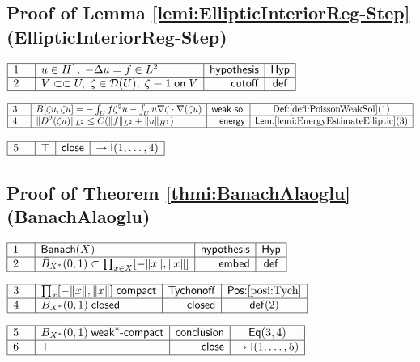 \documentclass[11pt,reqno]{amsart}
\begin{document}
	\subsection*{Proof of Lemma \protect\ref{lemi:EllipticInteriorReg-Step} (\textsf{EllipticInteriorReg-Step})}
	\noindent$\begin{array}{|m{0.5cm}|l|r|c|}
	\hline
	1 & u\in H^{1},\;-\Delta u=f\in L^{2} & \mathsf{hypothesis} & \mathsf{Hyp} \\ \hline
	2 & V\subset\subset U,\;\zeta\in\mathcal{D}(U),\;\zeta\equiv1\;\mathsf{on}\;V & \mathsf{cutoff} & \mathsf{def} \\ \hline
	\end{array}$
	\par\nointerlineskip\noindent$\begin{array}{|m{0.5cm}|l|r|c|}
	\hline
	3 & B[\zeta u,\zeta u]=-\int_{U}f\zeta^{2}u-\int_{U}u\nabla\zeta\cdot\nabla(\zeta u) & \mathsf{weak\ sol} & \textsf{Def:}\ref{defi:PoissonWeakSol}(1) \\ \hline
	4 & \|D^{2}(\zeta u)\|_{L^{2}}\le C(\|f\|_{L^{2}}+\|u\|_{H^{1}}) & \mathsf{energy} & \textsf{Lem:}\ref{lemi:EnergyEstimateElliptic}(3) \\ \hline
	\end{array}$
	\par\nointerlineskip\noindent$\begin{array}{|m{0.5cm}|l|r|c|}
	\hline
	5 & \top & \mathsf{close} & \to\mathsf{I}(1,\dots,4) \\ \hline
	\end{array}$
	\medskip
	
	\subsection*{Proof of Theorem \protect\ref{thmi:BanachAlaoglu} (\textsf{BanachAlaoglu})}
	\noindent$\begin{array}{|m{0.5cm}|l|r|c|}
	\hline
	1 & \mathsf{Banach}(X) & \mathsf{hypothesis} & \mathsf{Hyp} \\ \hline
	2 & \bar{B}_{X^{*}}(0,1)\subset\prod_{x\in X}[-\|x\|,\|x\|] & \mathsf{embed} & \mathsf{def} \\ \hline
	\end{array}$
	\par\nointerlineskip\noindent$\begin{array}{|m{0.5cm}|l|r|c|}
	\hline
	3 & \prod_{x}[-\|x\|,\|x\|]\;\mathsf{compact} & \mathsf{Tychonoff} & \textsf{Pos:}\ref{posi:Tych} \\ \hline
	4 & \bar{B}_{X^{*}}(0,1)\;\mathsf{closed} & \mathsf{closed} & \mathsf{def}(2) \\ \hline
	\end{array}$
	\par\nointerlineskip\noindent$\begin{array}{|m{0.5cm}|l|r|c|}
	\hline
	5 & \bar{B}_{X^{*}}(0,1)\;\mathsf{weak}^{\ast}\text{-}\mathsf{compact} & \mathsf{conclusion} & \mathsf{Eq}(3,4) \\ \hline
	6 & \top & \mathsf{close} & \to\mathsf{I}(1,\dots,5) \\ \hline
	\end{array}$
	\medskip
	
\end{document}
